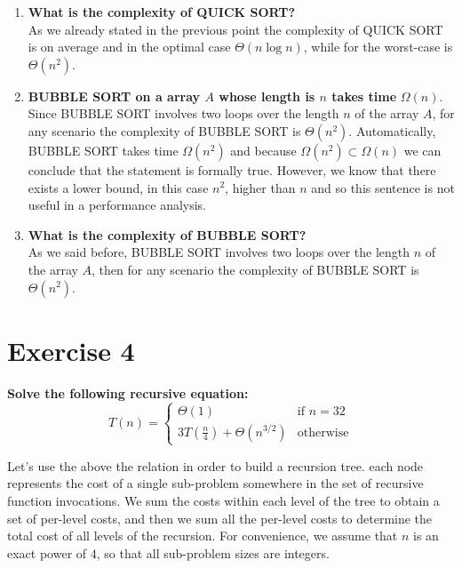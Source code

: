 \documentclass{article}
\begin{document}
\begin{enumerate}[label=(\alph*)]
		\item \textbf{What is the complexity of QUICK SORT?}\\
		As we already stated in the previous point the complexity of QUICK SORT is on average and in the optimal case $\Theta(n\log n)$, while for the worst-case is $\Theta(n^2)$.
		\item \textbf{BUBBLE SORT on a array $A$ whose length is $n$ takes time} $\Omega(n)$.
		Since BUBBLE SORT involves two loops over the length $n$ of the array $A$, for any scenario the complexity of BUBBLE SORT is $\Theta(n^2)$. Automatically, BUBBLE SORT takes time $\Omega(n^2)$ and because $\Omega(n^2) \subset \Omega(n) $ we can conclude that the statement is formally true. However, we know that there exists a lower bound, in this case $n^2$, higher than $n$ and so this sentence is not useful in a performance analysis. 
		\item  \textbf{What is the complexity of BUBBLE SORT?} \\
		As we said before,  BUBBLE SORT involves two loops over the length $n$ of the array $A$, then for any scenario the complexity of BUBBLE SORT is $\Theta(n^2)$. 
	\end{enumerate}

	\section*{Exercise 4}
	\textbf{Solve the following recursive equation:}
	$$
	T(n) = \begin{cases}
			\Theta(1) & \text{if } n= 32 \\
			3T(\frac{n}{4}) + \Theta(n^{3/2}) & \text{otherwise}
			\end{cases} 
	$$
	
	\noindent Let's use the above the relation in order to build a recursion tree.  each node represents the cost of a single sub-problem somewhere in the set of recursive function invocations. We sum the costs within each level of the tree to obtain a set of per-level costs, and then we sum all the per-level costs to determine the total cost of all levels of the recursion. For convenience, we assume that $n$ is an exact power of $4$, so that all sub-problem sizes are integers. \\
	
\end{document}
